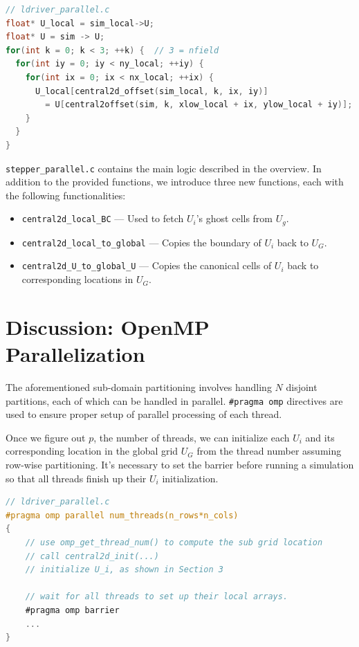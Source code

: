 \documentclass{article}
\begin{document}
\begin{lstlisting}[language=C]
// ldriver_parallel.c
float* U_local = sim_local->U;
float* U = sim -> U;
for(int k = 0; k < 3; ++k) {  // 3 = nfield
  for(int iy = 0; iy < ny_local; ++iy) {
    for(int ix = 0; ix < nx_local; ++ix) {
      U_local[central2d_offset(sim_local, k, ix, iy)]
        = U[central2offset(sim, k, xlow_local + ix, ylow_local + iy)];
    }
  }
}
\end{lstlisting}

\texttt{stepper\_parallel.c} contains the main logic described in the overview. In addition to the provided functions, we introduce three new functions, each with the following functionalities:

\begin{itemize}
	\item \texttt{central2d\_local\_BC} --- Used to fetch $U_i$'s ghost cells from $U_g$.
	\item \texttt{central2d\_local\_to\_global} --- Copies the boundary of $U_i$ back to $U_G$.
	\item \texttt{central2d\_U\_to\_global\_U} --- Copies the canonical cells of $U_i$ back to corresponding locations in $U_G$.
\end{itemize}

\section{Discussion: OpenMP Parallelization}

The aforementioned sub-domain partitioning involves handling $N$ disjoint partitions, each of which can be handled in parallel. \texttt{\#pragma omp} directives are used to ensure proper setup of parallel processing of each thread.

Once we figure out $p$, the number of threads, we can initialize each $U_i$ and its corresponding location in the global grid $U_G$ from the thread number assuming row-wise partitioning. It's necessary to set the barrier before running a simulation so that all threads finish up their $U_i$ initialization.

\begin{lstlisting}[language=C]
// ldriver_parallel.c
#pragma omp parallel num_threads(n_rows*n_cols)
{
    // use omp_get_thread_num() to compute the sub grid location
    // call central2d_init(...)
    // initialize U_i, as shown in Section 3

    // wait for all threads to set up their local arrays.
    #pragma omp barrier
    ...
}
\end{lstlisting}
\end{document}
